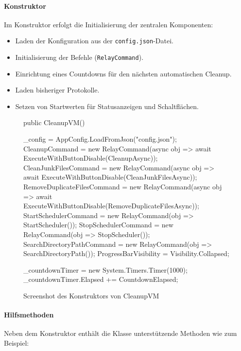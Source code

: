 \paragraph{Konstruktor}
Im Konstruktor erfolgt die Initialisierung der zentralen Komponenten:

\begin{itemize}
  \item Laden der Konfiguration aus der \texttt{config.json}-Datei.
  \item Initialisierung der Befehle (\texttt{RelayCommand}).
  \item Einrichtung eines Countdowns für den nächsten automatischen Cleanup.
  \item Laden bisheriger Protokolle.
  \item Setzen von Startwerten für Statusanzeigen und Schaltflächen.
\end{itemize}


\begin{figure}[H]
    \centering
    \begin{cs}
public CleanupVM()
{
    _config = AppConfig.LoadFromJson("config.json");
    CleanupCommand = new RelayCommand(async obj => await ExecuteWithButtonDisable(CleanupAsync));
    CleanJunkFilesCommand = new RelayCommand(async obj => await ExecuteWithButtonDisable(CleanJunkFilesAsync));
    RemoveDuplicateFilesCommand = new RelayCommand(async obj => await ExecuteWithButtonDisable(RemoveDuplicateFilesAsync));
    StartSchedulerCommand = new RelayCommand(obj => StartScheduler());
    StopSchedulerCommand = new RelayCommand(obj => StopScheduler());
    SearchDirectoryPathCommand = new RelayCommand(obj => SearchDirectoryPath());
    ProgressBarVisibility = Visibility.Collapsed;

    _countdownTimer = new System.Timers.Timer(1000); 
    _countdownTimer.Elapsed += CountdownElapsed;
}
\end{cs}
    \caption{Screenshot des Konstruktors von CleanupVM}
\end{figure}

\paragraph{Hilfsmethoden}
Neben dem Konstruktor enthält die Klasse unterstützende Methoden wie zum Beispiel:

